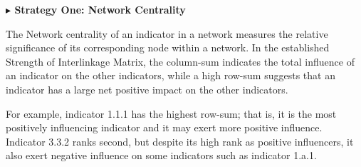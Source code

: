 \documentclass[12pt]{article}  %
\begin{document}
\vspace{0.7mm}\begin{itshape}
\textbf{$\blacktriangleright$ Strategy One: Network Centrality}
\end{itshape}


The Network centrality of an indicator in a network measures the relative significance  of its corresponding node within a network.
In the established Strength of Interlinkage Matrix, the column-sum indicates the total influence of an indicator on the other indicators, while a high row-sum suggests that an indicator has a large net positive impact on the other indicators. 





For example,  indicator 1.1.1  has
the highest row-sum; that is, it is the most positively influencing indicator and it may exert more positive influence. Indicator 3.3.2 ranks second, but despite its high rank
as positive influencers, it also exert negative influence
on some indicators such as indicator 1.a.1.
\end{document}
